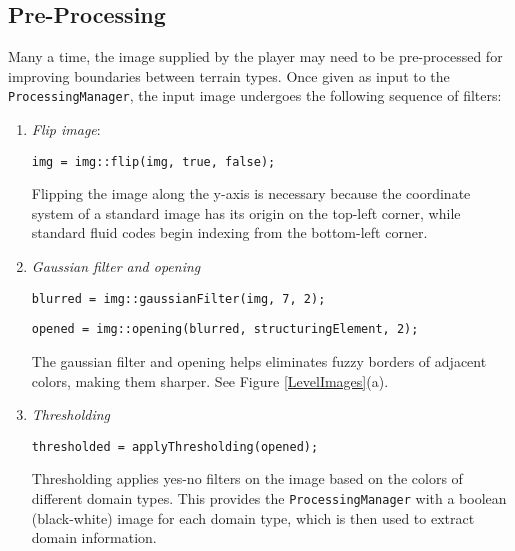\subsection{Pre-Processing}

Many a time, the image supplied by the player may need to be pre-processed for improving boundaries between terrain types. Once given as input to the \verb|ProcessingManager|, the input image undergoes the following sequence of filters:

\begin{enumerate}
	\item \textit{Flip image}: 
	
	\verb|img = img::flip(img, true, false);|
	
	Flipping the image along the y-axis is necessary because the coordinate system of a standard image has its origin on the top-left corner, while standard fluid codes begin indexing from the bottom-left corner.

	\item \textit{Gaussian filter and opening}

	\verb|blurred = img::gaussianFilter(img, 7, 2);|

	\verb|opened = img::opening(blurred, structuringElement, 2);|
	
	The gaussian filter and opening helps eliminates fuzzy borders of adjacent colors, making them sharper. See Figure \ref{LevelImages}(a).

	\item \textit{Thresholding}

	\verb|thresholded = applyThresholding(opened);|
	
	Thresholding applies yes-no filters on the image based on the colors of different domain types. This provides the \verb|ProcessingManager| with a boolean (black-white) image for each domain type, which is then used to extract domain information.

\end{enumerate}
